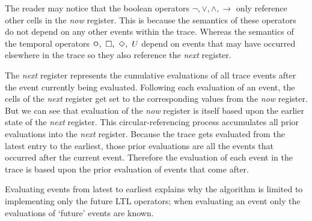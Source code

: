 The reader may notice that the boolean operators $ \neg, \lor, \land, \rightarrow $ only reference other cells in the \textit{now} register.  This is because the semantics of these operators do not depend on any other events within the trace.  Whereas the semantics of the temporal operators $ \LTLnext, \ \LTLalways,  \ \LTLeventually, \ U $ depend on events that may have occurred elsewhere in the trace so they also reference the \textit{next} register.

The \textit{next} register represents the cumulative evaluations of all trace events after the event currently being evaluated.  Following each evaluation of an event, the cells of the \textit{next} register get set to the corresponding values from the \textit{now} register.  But we can see that evaluation of the \textit{now} register is itself based upon the earlier state of the \textit{next} register.  This circular-referencing process accumulates all prior evaluations into the \textit{next} register.  Because the trace gets evaluated from the latest entry to the earliest, those prior evaluations are all the events that occurred after the current event.  Therefore the evaluation of each event in the trace is based upon the prior evaluation of events that come after.

Evaluating events from latest to earliest explains why the algorithm is limited to implementing only the future LTL operators; when evaluating an event only the evaluations of `future' events are known.

